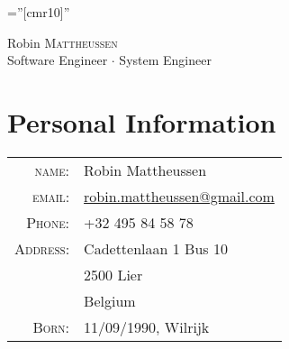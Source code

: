 \documentclass[a4paper,10pt]{article}
\begin{document}

\pagestyle{empty} %

\font\fb=''[cmr10]'' %

\par{\centering
		{\Huge Robin \textsc{Mattheussen}\\
		{\footnotesize Software Engineer \( \cdot \) System Engineer}
	}\bigskip\par}

\section{Personal Information}

\begin{tabular}{rl}
	\textsc{name:}		& Robin Mattheussen \\
	\textsc{email:}     & \href{mailto:robin.mattheussen@gmail.com}{robin.mattheussen@gmail.com} \\
    \textsc{Phone:}     & +32 495 84 58 78 \\
   	\textsc{Address:}   & Cadettenlaan 1 Bus 10 \\ & 2500 Lier \\ & Belgium \\
   	\textsc{Born:}		& 11/09/1990, Wilrijk
\end{tabular}

\end{document}
